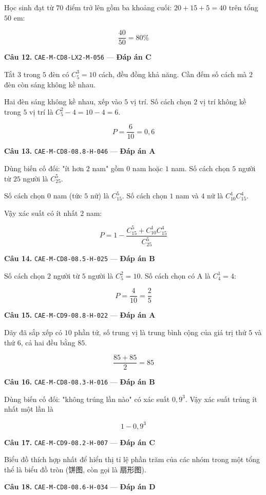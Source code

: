 \documentclass[11pt, a4paper]{article}
\begin{document}
Học sinh đạt từ $70$ điểm trở lên gồm ba khoảng cuối: $20 + 15 + 5 = 40$ trên tổng $50$ em:

$$\frac{40}{50} = 80\%$$

\textbf{Câu 12.} \texttt{CAE-M-CD8-LX2-M-056} — \textbf{Đáp án C}

Tắt $3$ trong $5$ đèn có $C_5^3 = 10$ cách, đều đồng khả năng. Cần đếm số cách mà $2$ đèn còn sáng không kề nhau.

Hai đèn sáng không kề nhau, xếp vào $5$ vị trí. Số cách chọn $2$ vị trí không kề trong $5$ vị trí là $C_5^2 - 4 = 10 - 4 = 6$.

$$P = \frac{6}{10} = 0,6$$

\textbf{Câu 13.} \texttt{CAE-M-CD8-08.8-H-046} — \textbf{Đáp án A}

Dùng biến cố đối: "ít hơn $2$ nam" gồm $0$ nam hoặc $1$ nam. Số cách chọn $5$ người từ $25$ người là $C_{25}^5$.

Số cách chọn $0$ nam (tức $5$ nữ) là $C_{15}^5$. Số cách chọn $1$ nam và $4$ nữ là $C_{10}^1 C_{15}^4$.

Vậy xác suất có ít nhất $2$ nam:

$$P = 1 - \frac{C_{15}^5 + C_{10}^1 C_{15}^4}{C_{25}^5}$$

\textbf{Câu 14.} \texttt{CAE-M-CD8-08.5-H-025} — \textbf{Đáp án B}

Số cách chọn $2$ người từ $5$ người là $C_5^2 = 10$. Số cách chọn có A là $C_4^1 = 4$:

$$P = \frac{4}{10} = \frac{2}{5}$$

\textbf{Câu 15.} \texttt{CAE-M-CD9-08.8-H-022} — \textbf{Đáp án A}

Dãy đã sắp xếp có $10$ phần tử, số trung vị là trung bình cộng của giá trị thứ $5$ và thứ $6$, cả hai đều bằng $85$.

$$\frac{85 + 85}{2} = 85$$

\textbf{Câu 16.} \texttt{CAE-M-CD8-08.3-H-016} — \textbf{Đáp án B}

Dùng biến cố đối: "không trúng lần nào" có xác suất $0,9^3$. Vậy xác suất trúng ít nhất một lần là

$$1 - 0,9^3$$

\textbf{Câu 17.} \texttt{CAE-M-CD9-08.2-H-007} — \textbf{Đáp án C}

Biểu đồ thích hợp nhất để hiển thị tỉ lệ phần trăm của các nhóm trong một tổng thể là biểu đồ tròn (饼图, còn gọi là 扇形图).

\textbf{Câu 18.} \texttt{CAE-M-CD8-08.6-H-034} — \textbf{Đáp án D}
\end{document}
